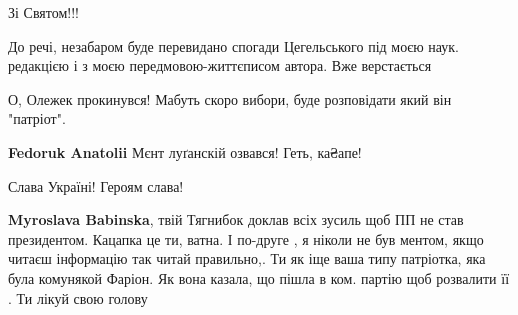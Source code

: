 \begin{itemize}
Зі Святом!!!

 

До речі, незабаром буде перевидано спогади Цегельського під моєю наук.
редакцією і з моєю передмовою-життєписом автора. Вже верстається

 

О, Олежек прокинувся! Мабуть скоро вибори, буде розповідати який він "патріот".

\begin{itemize}
 
\textbf{Fedoruk Anatolii} Мєнт луґанскій озвався! Геть, ка₴апе!

 
Слава Україні! Героям слава!

 
\textbf{Myroslava Babinska}, твій Тягнибок доклав всіх зусиль щоб ПП не став
президентом. Кацапка це ти, ватна. І по-друге , я ніколи не був ментом, якщо
читаєш інформацію так читай правильно,. Ти як іще ваша типу патріотка, яка була
комунякой Фаріон. Як вона казала, що пішла в ком. партію щоб розвалити її . Ти
лікуй свою голову

 

\end{itemize}
\end{itemize}

